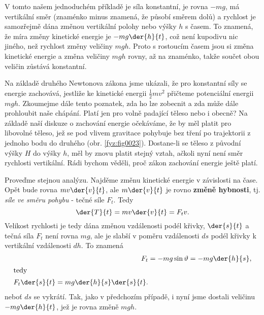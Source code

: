     V tomto našem jednoduchém příkladě je síla konstantní, je rovna \(- mg\), má vertikální směr 
    (znaménko minus znamená, že působí směrem dolů) a rychlost je samozřejmě dána změnou vertikální 
    polohy nebo výšky \(h\) s časem. To znamená, že míra změny kinetické energie je \(- 
    mg\der{h}{t}\), což není kupodivu nic jiného, než rychlost změny veličiny \(mgh\). Proto s 
    rostoucím časem jsou si změna kinetické energie a změna veličiny \(mgh\) rovny, až na znaménko, 
    takže součet obou veličin zůstává konstantní.

    
    Na základě druhého Newtonova zákona jsme ukázali, že pro konstantní síly se energie zachovává, 
    jestliže ke kinetické energii \(\frac{1}{2}mv^2\) přičteme potenciální energii \(mgh\). 
    Zkoumejme dále tento poznatek, zda ho lze zobecnit a zda může dále prohloubit naše chápání. 
    Platí jen pro volně padající těleso nebo i obecně? Na základě naší diskuze o zachování energie 
    očekáváme, že by měl platit pro libovolné těleso, jež se pod vlivem gravitace pohybuje bez 
    tření po trajektorii z jednoho bodu do druhého (obr. \ref{fyz:fig0023}). Dostane-li se těleso z 
    původní výšky \(H\) do výšky \(h\), měl by znovu platit stejný vztah, ačkoli nyní není směr 
    rychlosti vertikální. Rádi bychom věděli, proč zákon zachování energie ještě platí.
    
    Proveďme stejnou analýzu. Najděme změnu kinetické energie v závislosti na čase. Opět bude    
    rovna \(mv\der{v}{t}\), ale \(m\der{v}{t}\) je rovno \textbf{změně hybnosti}, tj. \emph{síle ve 
    směru pohybu} - tečné síle \(F_t\). Tedy
    \begin{equation}\label{fyz:eq028}
      \der{T}{t} = mv\der{v}{t} = F_tv.
    \end{equation}
    Velikost rychlosti je tedy dána změnou vzdálenosti podél křivky, \(\der{s}{t}\) a tečná síla 
    \(F_t\) není rovna \(mg\), ale je slabší v poměru vzdálenosti \(ds\) podél křivky k vertikální 
    vzdálenosti \(dh\). To znamená
    \begin{align}
      F_t &= -mg\sin\vartheta = -mg\der{h}{s},  \nonumber \\
      \shortintertext{tedy}
      F_t\der{s}{t} = mg\der{h}{s}\der{s}{t}.   \label{fyz:eq029}
    \end{align}
    neboť \(ds\) se vykrátí. Tak, jako v předchozím případě, i nyní jsme dostali veličinu \(- 
    mg\der{h}{t}\), jež je rovna změně \(mgh\).
    
